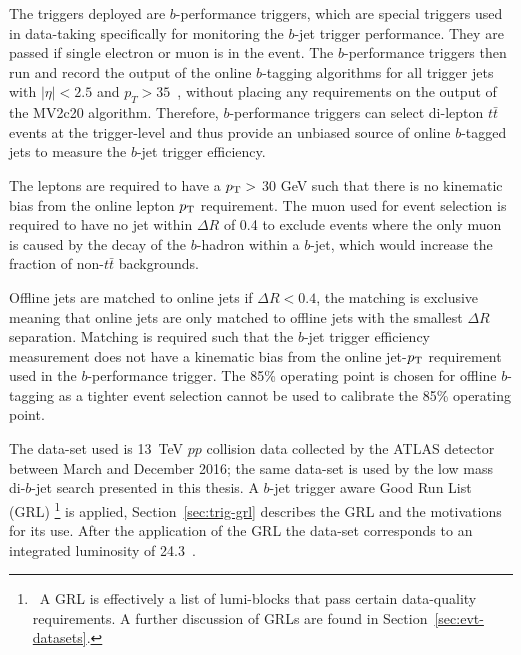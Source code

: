 The triggers deployed are $b$-performance triggers, which are special triggers used in data-taking specifically for monitoring the $b$-jet trigger performance.
They are passed if single electron or muon is in the event.
The $b$-performance triggers then run and record the output of the online $b$-tagging algorithms for all trigger jets with $|\eta|<2.5$ and
\mbox{$p_{T}>35$~\GeV}, without placing any requirements on the output of the MV2c20 algorithm.
Therefore, $b$-performance triggers can select  di-lepton $t\bar{t}$ events at the trigger-level
and thus provide an unbiased source of online $b$-tagged jets to measure the $b$-jet trigger efficiency.

The leptons are required to have a $p_{\mathrm{T}} >$ 30 GeV such that there is no kinematic bias from the online lepton $p_{\mathrm{T}}$ requirement. 
The muon used for event selection is required to have no jet within  $\Delta R$ of 0.4 to exclude %
events where the only muon is caused by the decay of the $b$-hadron within a $b$-jet, which would increase the fraction of non-$t\bar{t}$ backgrounds.

Offline jets are matched to online jets if $\Delta R < 0.4$,
the matching is exclusive meaning that online jets are only matched to offline jets with the smallest $\Delta R$ separation.
Matching is required such that the $b$-jet trigger efficiency measurement does not have a kinematic bias
from the online jet-$p_{\mathrm{T}}$ requirement used in the $b$-performance trigger.
The 85\% operating point is chosen for offline $b$-tagging as a tighter event selection
cannot be used to calibrate the 85\% operating point.





The data-set used is 13~TeV $pp$ collision data collected by the ATLAS detector between March and December 2016;
the same data-set is used by the low mass di-$b$-jet search presented in this thesis. %
A $b$-jet trigger aware Good Run List (GRL) 
\footnote{\ A GRL is effectively a list of lumi-blocks that pass certain data-quality requirements.
  A further discussion of GRLs are found in Section~\ref{sec:evt-datasets}.}
is applied, Section~\ref{sec:trig-grl} describes the GRL and the motivations for its use.
After the application of the GRL the data-set corresponds to an integrated luminosity of 24.3~\ifb.

